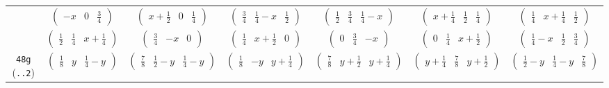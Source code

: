 \documentclass[fleqn,9pt,landscape]{jsarticle}
\begin{document}
\begin{center}
\begin{longtable}{ccccccc}
& $ \begin{pmatrix} - x & 0 & \frac{3}{4} \end{pmatrix} $ & $ \begin{pmatrix} x + \frac{1}{2} & 0 & \frac{1}{4} \end{pmatrix} $ & $ \begin{pmatrix} \frac{3}{4} & \frac{1}{4} - x & \frac{1}{2} \end{pmatrix} $ & $ \begin{pmatrix} \frac{1}{2} & \frac{3}{4} & \frac{1}{4} - x \end{pmatrix} $ & $ \begin{pmatrix} x + \frac{1}{4} & \frac{1}{2} & \frac{1}{4} \end{pmatrix} $ & $ \begin{pmatrix} \frac{1}{4} & x + \frac{1}{4} & \frac{1}{2} \end{pmatrix} $ \\
& $ \begin{pmatrix} \frac{1}{2} & \frac{1}{4} & x + \frac{1}{4} \end{pmatrix} $ & $ \begin{pmatrix} \frac{3}{4} & - x & 0 \end{pmatrix} $ & $ \begin{pmatrix} \frac{1}{4} & x + \frac{1}{2} & 0 \end{pmatrix} $ & $ \begin{pmatrix} 0 & \frac{3}{4} & - x \end{pmatrix} $ & $ \begin{pmatrix} 0 & \frac{1}{4} & x + \frac{1}{2} \end{pmatrix} $ & $ \begin{pmatrix} \frac{1}{4} - x & \frac{1}{2} & \frac{3}{4} \end{pmatrix} $ \\ \hline
{\tt 48g} ({\tt ..2}) & $ \begin{pmatrix} \frac{1}{8} & y & \frac{1}{4} - y \end{pmatrix} $ & $ \begin{pmatrix} \frac{7}{8} & \frac{1}{2} - y & \frac{1}{4} - y \end{pmatrix} $ & $ \begin{pmatrix} \frac{1}{8} & - y & y + \frac{1}{4} \end{pmatrix} $ & $ \begin{pmatrix} \frac{7}{8} & y + \frac{1}{2} & y + \frac{1}{4} \end{pmatrix} $ & $ \begin{pmatrix} y + \frac{1}{4} & \frac{7}{8} & y + \frac{1}{2} \end{pmatrix} $ & $ \begin{pmatrix} \frac{1}{2} - y & \frac{1}{4} - y & \frac{7}{8} \end{pmatrix} $ \\

\end{longtable}
\end{center}
\end{document}
